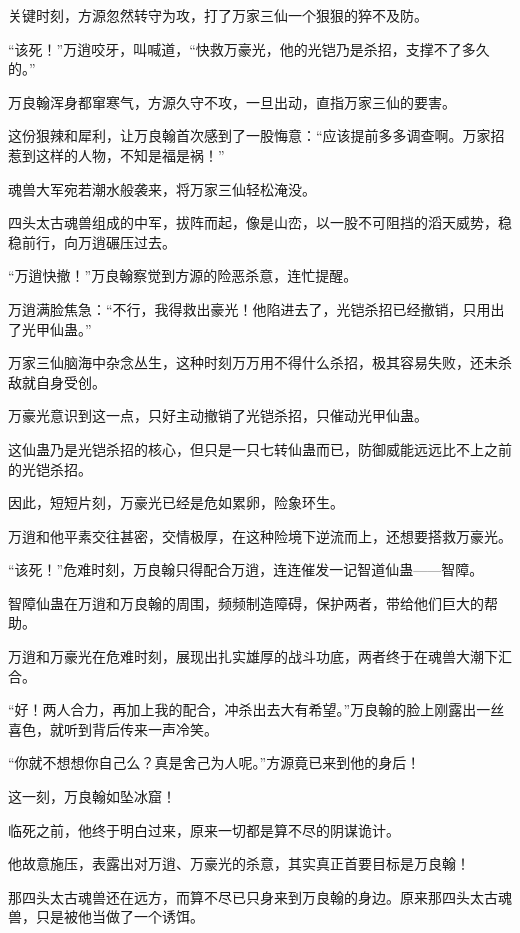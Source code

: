 
\begin{this_body}

关键时刻，方源忽然转守为攻，打了万家三仙一个狠狠的猝不及防。

“该死！”万逍咬牙，叫喊道，“快救万豪光，他的光铠乃是杀招，支撑不了多久的。”

万良翰浑身都窜寒气，方源久守不攻，一旦出动，直指万家三仙的要害。

这份狠辣和犀利，让万良翰首次感到了一股悔意：“应该提前多多调查啊。万家招惹到这样的人物，不知是福是祸！”

魂兽大军宛若潮水般袭来，将万家三仙轻松淹没。

四头太古魂兽组成的中军，拔阵而起，像是山峦，以一股不可阻挡的滔天威势，稳稳前行，向万逍碾压过去。

“万逍快撤！”万良翰察觉到方源的险恶杀意，连忙提醒。

万逍满脸焦急：“不行，我得救出豪光！他陷进去了，光铠杀招已经撤销，只用出了光甲仙蛊。”

万家三仙脑海中杂念丛生，这种时刻万万用不得什么杀招，极其容易失败，还未杀敌就自身受创。

万豪光意识到这一点，只好主动撤销了光铠杀招，只催动光甲仙蛊。

这仙蛊乃是光铠杀招的核心，但只是一只七转仙蛊而已，防御威能远远比不上之前的光铠杀招。

因此，短短片刻，万豪光已经是危如累卵，险象环生。

万逍和他平素交往甚密，交情极厚，在这种险境下逆流而上，还想要搭救万豪光。

“该死！”危难时刻，万良翰只得配合万逍，连连催发一记智道仙蛊——智障。

智障仙蛊在万逍和万良翰的周围，频频制造障碍，保护两者，带给他们巨大的帮助。

万逍和万豪光在危难时刻，展现出扎实雄厚的战斗功底，两者终于在魂兽大潮下汇合。

“好！两人合力，再加上我的配合，冲杀出去大有希望。”万良翰的脸上刚露出一丝喜色，就听到背后传来一声冷笑。

“你就不想想你自己么？真是舍己为人呢。”方源竟已来到他的身后！

这一刻，万良翰如坠冰窟！

临死之前，他终于明白过来，原来一切都是算不尽的阴谋诡计。

他故意施压，表露出对万逍、万豪光的杀意，其实真正首要目标是万良翰！

那四头太古魂兽还在远方，而算不尽已只身来到万良翰的身边。原来那四头太古魂兽，只是被他当做了一个诱饵。


\end{this_body}
